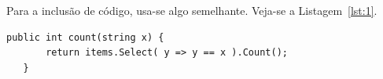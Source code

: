 Para a inclusão de código, usa-se algo semelhante. Veja-se a Listagem~\ref{lst:1}.

\begin{lstlisting}[language={[sharp]c},
                   caption={Método para contar o número de elementos numa lista iguais a uma determinada string.},
                   label=lst:1]
   public int count(string x) {
       return items.Select( y => y == x ).Count();
   }
\end{lstlisting}

